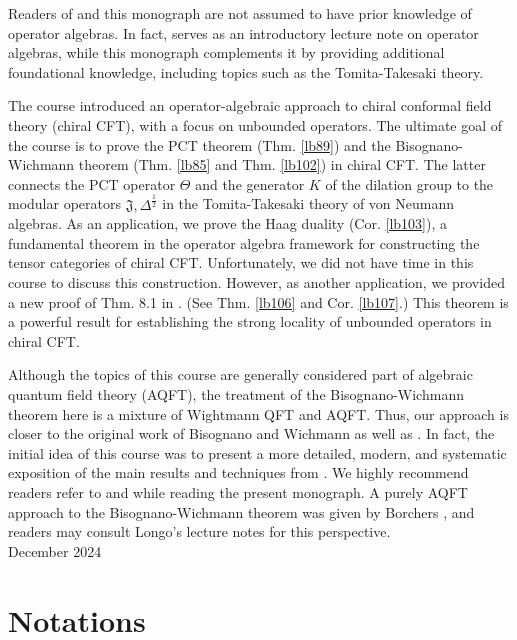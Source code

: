 \documentclass[12pt,b5paper,notitlepage]{article}
\theoremstyle{definition}
\theoremstyle{plain}
\newcommand{\fk}{\mathfrak}
\newcommand{\half}{\frac{1}{2}}
\numberwithin{equation}{section}
\begin{document}
Readers of \cite{Gui-S} and this monograph are not assumed to have prior knowledge of operator algebras.  In fact, \cite{Gui-S} serves as an introductory lecture note on operator algebras, while this monograph complements it by providing additional foundational knowledge, including topics such as the Tomita-Takesaki theory.

The course introduced an operator-algebraic approach to chiral conformal field theory (chiral CFT), with a focus on unbounded operators. The ultimate goal of the course is to prove the PCT theorem (Thm. \ref{lb89}) and the Bisognano-Wichmann theorem (Thm. \ref{lb85} and Thm. \ref{lb102}) in chiral CFT. The latter connects the PCT operator $\Theta$ and the generator $K$ of the dilation group to the modular operators $\fk J,\Delta^\half$ in the Tomita-Takesaki theory of von Neumann algebras. As an application, we prove the Haag duality (Cor. \ref{lb103}), a fundamental theorem in the operator algebra framework for constructing the tensor categories of chiral CFT. Unfortunately, we did not have time in this course to discuss this construction. However, as another application, we provided a new proof of Thm. 8.1 in \cite{CKLW18}. (See Thm. \ref{lb106} and Cor. \ref{lb107}.) This theorem is a powerful result for establishing the strong locality of unbounded operators in chiral CFT.

Although the topics of this course are generally considered part of algebraic quantum field theory (AQFT), the treatment of the Bisognano-Wichmann theorem here is a mixture of Wightmann QFT and AQFT. Thus, our approach is closer to the original work of Bisognano and Wichmann \cite{BW75} as well as \cite{BS90}. In fact, the initial idea of this course was to present a more detailed, modern, and systematic exposition of the main results and techniques from \cite{BS90}. We highly recommend readers refer to \cite{BW75} and \cite{BS90} while reading the present monograph. A purely AQFT approach to the Bisognano-Wichmann theorem was given by Borchers \cite{Bor92}, and readers may consult Longo's lecture notes \cite{Lon08} for this perspective.\\[2ex]

\hfill December 2024





\newpage


\section{Notations}
\end{document}
